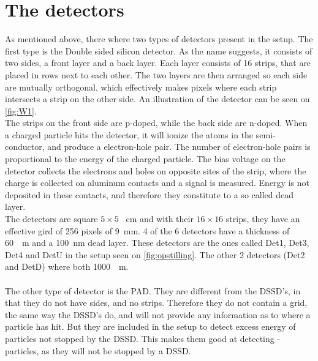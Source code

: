 \section{The detectors}
As mentioned above, there where two types of detectors present in the setup. The first type is the Double sided silicon detector. 
As the name suggests, it consists of two sides, a front layer and a back layer. Each layer consists of 16 strips, that are placed in rows next to each other. The two layers are then arranged so each side are mutually orthogonal, which effectively makes pixels where each strip intersects a strip on the other side. An illustration of the detector can be seen on \cref{fig:W1}.\\
The strips on the front side are p-doped, while the back side are n-doped. When a charged particle hits the detector, it will ionize the atoms in the semi-conductor, and produce a electron-hole pair. The number of electron-hole pairs is proportional to the energy of the charged particle. 
The bias voltage on the detector collects the electrons and holes on opposite sites of the strip, where the charge is collected on aluminum contacts and a signal is measured. Energy is not deposited in these contacts, and therefore they constitute to a so called dead layer. \\
The detectors are square $5\times 5$ \SI{}{cm} and with their $16\times 16$ strips, they have an effective gird of  256 pixels of \SI{9}{mm}. 
4 of the 6 detectors have a thickness of \SI{60}{\mu m} and a \SI{100}{nm} dead layer. These detectors are the ones called Det1, Det3, Det4 and DetU in the setup seen on \cref{fig:opstilling}. The other 2 detectors (Det2 and DetD) where both \SI{1000}{\mu m}.
\\
\\
The other type of detector is the PAD. They are different from the DSSD's, in that they do not have sides, and no strips. Therefore they do not contain a grid, the same way the DSSD's do, and will not provide any information as to where a particle has hit. But they are included in the setup to detect excess energy of particles not stopped by the DSSD. This makes them good at detecting \be-particles, as they will not be stopped by a DSSD.

